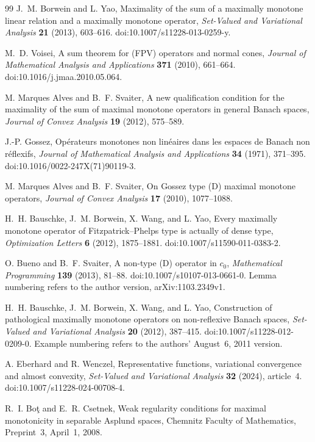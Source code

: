 \documentclass[11pt]{article}
\begin{document}
\begin{thebibliography}{99}
J.~M. Borwein and L. Yao,
Maximality of the sum of a maximally monotone linear relation and a
maximally monotone operator,
\emph{Set-Valued and Variational Analysis} \textbf{21} (2013), 603--616.
doi:10.1007/s11228-013-0259-y.

M.~D. Voisei,
A sum theorem for (FPV) operators and normal cones,
\emph{Journal of Mathematical Analysis and Applications}
\textbf{371} (2010), 661--664.
doi:10.1016/j.jmaa.2010.05.064.

M. Marques Alves and B.~F. Svaiter,
A new qualification condition for the maximality of the sum of maximal
monotone operators in general Banach spaces,
\emph{Journal of Convex Analysis} \textbf{19} (2012), 575--589.

J.-P. Gossez,
Op\'{e}rateurs monotones non lin\'{e}aires dans les espaces de Banach non r\'{e}flexifs,
\emph{Journal of Mathematical Analysis and Applications}
\textbf{34} (1971), 371--395.
doi:10.1016/0022-247X(71)90119-3.

M. Marques Alves and B.~F. Svaiter,
On Gossez type (D) maximal monotone operators,
\emph{Journal of Convex Analysis} \textbf{17} (2010), 1077--1088.

H.~H. Bauschke, J.~M. Borwein, X. Wang, and L. Yao,
Every maximally monotone operator of Fitzpatrick--Phelps type is actually
of dense type,
\emph{Optimization Letters} \textbf{6} (2012), 1875--1881.
doi:10.1007/s11590-011-0383-2.

O. Bueno and B.~F. Svaiter,
A non-type (D) operator in $c_0$,
\emph{Mathematical Programming} \textbf{139} (2013), 81--88.
doi:10.1007/s10107-013-0661-0.
Lemma numbering refers to the author version, arXiv:1103.2349v1.

H.~H. Bauschke, J.~M. Borwein, X. Wang, and L. Yao,
Construction of pathological maximally monotone operators on
non-reflexive Banach spaces,
\emph{Set-Valued and Variational Analysis} \textbf{20} (2012), 387--415.
doi:10.1007/s11228-012-0209-0.
Example numbering refers to the authors' August~6, 2011 version.

A. Eberhard and R. Wenczel,
Representative functions, variational convergence and almost convexity,
\emph{Set-Valued and Variational Analysis} \textbf{32} (2024), article~4.
doi:10.1007/s11228-024-00708-4.

R.~I. Bo\c{t} and E.~R. Csetnek,
Weak regularity conditions for maximal monotonicity in separable
Asplund spaces,
Chemnitz Faculty of Mathematics, Preprint~3, April~1, 2008.


\end{thebibliography}
\end{document}
